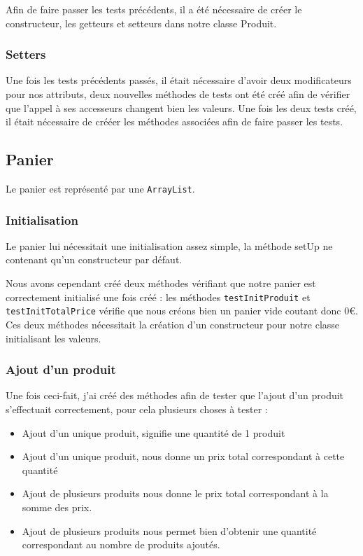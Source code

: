 \documentclass[a4paper, 11pt]{article}
\begin{document}
	Afin de faire passer les tests précédents, il a été nécessaire de créer le constructeur, les getteurs et setteurs dans notre classe Produit.

	\subsubsection{Setters}
	Une fois les tests précédents passés, il était nécessaire d'avoir deux modificateurs pour nos attributs, deux nouvelles méthodes de tests ont été créé afin
	de vérifier que l'appel à ses accesseurs changent bien les valeurs. Une fois les deux tests créé, il était nécessaire de crééer les méthodes associées afin
	de faire passer les tests.

	\subsection{Panier}
	Le panier est représenté par une \texttt{ArrayList}.
	\subsubsection{Initialisation}
	Le panier lui nécessitait une initialisation assez simple, la méthode setUp ne contenant qu'un constructeur par défaut.

	Nous avons cependant créé deux méthodes vérifiant que notre panier est correctement initialisé une fois créé : les méthodes \texttt{testInitProduit} et
	\texttt{testInitTotalPrice} vérifie que nous créons bien un panier vide coutant donc 0\euro{}. Ces deux méthodes nécessitait la création d'un constructeur pour notre
	classe initialisant les valeurs.

	\subsubsection{Ajout d'un produit}
	Une fois ceci-fait, j'ai créé des méthodes afin de tester que l'ajout d'un produit s'effectuait correctement, pour cela plusieurs choses à tester : 
	\begin{itemize}
		\item Ajout d'un unique produit, signifie une quantité de 1 produit
		\item Ajout d'un unique produit, nous donne un prix total correspondant à cette quantité
		\item Ajout de plusieurs produits nous donne le prix total correspondant à la somme des prix.
		\item Ajout de plusieurs produits nous permet bien d'obtenir une quantité correspondant au nombre de produits ajoutés. 
	\end{itemize}
\end{document}
